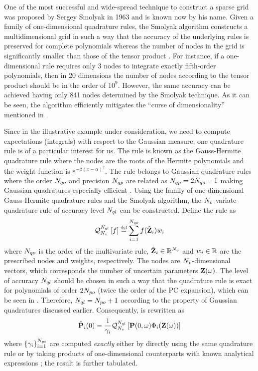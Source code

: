 One of the most successful and wide-spread technique to construct a sparse grid was proposed by Sergey Smolyak in 1963 and is known now by his name. Given a family of one-dimensional quadrature rules, the Smolyak algorithm constructs a multidimensional grid in such a way that the accuracy of the underlying rules is preserved for complete polynomials whereas the number of nodes in the grid is significantly smaller than those of the tensor product \cite{heiss2008, eldred2009}. For instance, if a one-dimensional rule requires only 3 nodes to integrate exactly fifth-order polynomials, then in 20 dimensions the number of nodes according to the tensor product should be in the order of $10^9$. However, the same accuracy can be achieved having only 841 nodes determined by the Smolyak technique. As it can be seen, the algorithm efficiently mitigates the ``curse of dimensionality'' mentioned in .

Since in the illustrative example under consideration, we need to compute expectations (integrals) with respect to the Gaussian measure, one quadrature rule is of a particular interest for us. The rule is known as the Gauss-Hermite quadrature rule where the nodes are the roots of the Hermite polynomials and the weight function is $e^{-\beta (x - \alpha)^2}$. The rule belongs to Gaussian quadrature rules where the order $N_{qo}$ and precision $N_{qp}$ are related as $N_{qp} = 2 N_{qo} - 1$ making Gaussian quadratures especially efficient \cite{heiss2008}. Using the family of one-dimensional Gauss-Hermite quadrature rules and the Smolyak algorithm, the ${N_v}$-variate quadrature rule of accuracy level $N_{ql}$ can be constructed. Define the rule as
\[
  \mathcal{Q}_{{N_v}}^{N_{ql}}\left[f\right] \stackrel{\text{\tiny def}}{=} \sum_{i = 1}^{N_{qo}} f(\hat{\mathbf{Z}}_i) w_i
\]
where $N_{qo}$ is the order of the multivariate rule, $\hat{\mathbf{Z}}_i \in \mathbb{R}^{N_v}$ and $w_i \in \mathbb{R}$ are the prescribed nodes and weights, respectively. The nodes are ${N_v}$-dimensional vectors, which corresponds the number of uncertain parameters $\mathbf{Z}(\omega)$. The level of accuracy $N_{ql}$ should be chosen in such a way that the quadrature rule is exact for polynomials of order $2 {N_{po}}$ (twice the order of the PC expansion), which can be seen in . Therefore, $N_{ql} = {N_{po}} + 1$ according to the property of Gaussian quadratures discussed earlier. Consequently,  is rewritten as
\[
  \hat{\mathbf{P}}_i(0) = \frac{1}{\gamma_i} \mathcal{Q}_{{N_v}}^{N_{ql}}\left[\mathbf{P}(0, \omega) \Phi_i(\mathbf{Z}(\omega))\right]
\]
where $\{ \gamma_i \}_{i = 1}^{{N_{pt}}}$ are computed \emph{exactly} either by directly using the same quadrature rule or by taking products of one-dimensional counterparts with known analytical expressions \cite{xiu2010}; the result is further tabulated.

